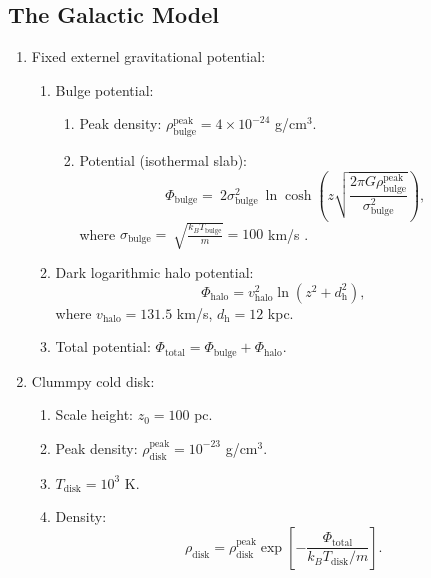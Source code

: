 \documentclass[twocolumn]{aastex631}
\begin{document}
\subsection{The Galactic Model}


\begin{enumerate}
\item Fixed externel gravitational potential:
  \begin{enumerate}
    \item Bulge potential:
      \begin{enumerate}
       \item Peak density: $\rho_{\text{bulge}}^{\text{peak}}=4\times 10^{-24}$ g/cm$^3$.
       \item Potential (isothermal slab):
         \begin{equation}
           \Phi_{\text{bulge}}=\
           2\sigma^2_{\text{bulge}}\
           \ln\cosh\left(z\sqrt{\frac{2\pi G\rho_{\text{bulge}}^{\text{peak}}}{\sigma^2_{\text{bulge}}}}\right),
         \end{equation}
          where $\displaystyle \sigma_{\text{bulge}}=\
                \sqrt{\frac{k_{B}T_{\text{bulge}}}{m}}=100$ km/s \citep{velocity-dispersion-MW}.
      \end{enumerate}

    \item Dark logarithmic halo potential:
         \begin{equation}
           \Phi_{\text{halo}}=v^2_{\text{halo}}\ln\left(z^2+d^2_{\text{h}}\right),
         \end{equation}
         where $v_{\text{halo}}=131.5$ km/s, $d_{\text{h}}=12$ kpc.

    \item Total potential: $\Phi_{\text{total}}=\Phi_{\text{bulge}}+\Phi_{\text{halo}}$.
  \end{enumerate}


\item Clummpy cold disk:
  \begin{enumerate}
    \item Scale height: $z_{0}=100$ pc. \citep{paek-ism-density}
    \item Peak density: $\rho_{\text{disk}}^{\text{peak}}=10^{-23}$ g/cm$^3$. \citep{paek-ism-density}
    \item $T_{\text{disk}}=10^{3}$ K. \citep{paek-ism-density}
    \item Density:
          \begin{equation}
             \rho_{\text{disk}}=\rho_{\text{disk}}^{\text{peak}}
             \exp\left[-\frac{\Phi_{\text{total}}}{k_{B}T_{\text{disk}}/m}\right].
             \label{disk-density}
          \end{equation}


\end{enumerate}
\end{enumerate}
\end{document}
